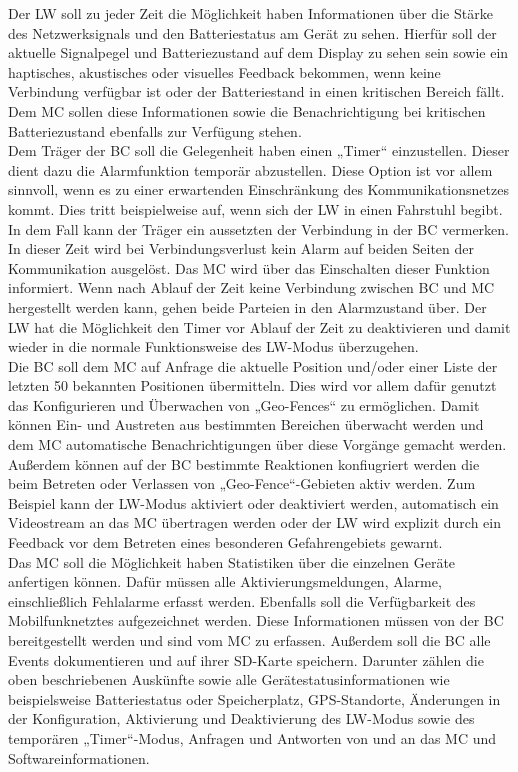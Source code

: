 \documentclass[thesis.tex]{subfiles}
\begin{document}
Der LW soll zu jeder Zeit die Möglichkeit haben Informationen über die Stärke des Netzwerksignals und den Batteriestatus am Gerät zu sehen.
Hierfür soll der aktuelle Signalpegel und Batteriezustand auf dem Display zu sehen sein sowie ein haptisches, akustisches oder visuelles
Feedback bekommen, wenn keine Verbindung verfügbar ist oder der Batteriestand in einen kritischen Bereich fällt.
Dem MC sollen diese Informationen sowie die Benachrichtigung bei kritischen Batteriezustand ebenfalls zur Verfügung stehen.
\\

Dem Träger der BC soll die Gelegenheit haben einen „Timer“ einzustellen.
Dieser dient dazu die Alarmfunktion temporär abzustellen.
Diese Option ist vor allem sinnvoll, wenn es zu einer erwartenden Einschränkung des Kommunikationsnetzes kommt.
Dies tritt beispielweise auf, wenn sich der LW in einen Fahrstuhl begibt.
In dem Fall kann der Träger ein aussetzten der Verbindung in der BC vermerken.
In dieser Zeit wird bei Verbindungsverlust kein Alarm auf beiden Seiten der Kommunikation ausgelöst.
Das MC wird über das Einschalten dieser Funktion informiert.
Wenn nach Ablauf der Zeit keine Verbindung zwischen BC und MC hergestellt werden kann, gehen beide Parteien in den Alarmzustand über.
Der LW hat die Möglichkeit den Timer vor Ablauf der Zeit zu deaktivieren und damit wieder in die normale Funktionsweise des LW-Modus überzugehen.
\\

Die BC soll dem MC auf Anfrage die aktuelle Position und/oder einer Liste der letzten 50 bekannten Positionen übermitteln.
Dies wird vor allem dafür genutzt das Konfigurieren und Überwachen von „Geo-Fences“ zu ermöglichen.
Damit können Ein- und Austreten aus bestimmten Bereichen überwacht werden und dem MC automatische Benachrichtigungen
über diese Vorgänge gemacht werden.
Außerdem können auf der BC bestimmte Reaktionen konfiugriert werden die beim Betreten oder Verlassen von „Geo-Fence“-Gebieten aktiv werden.
Zum Beispiel kann der LW-Modus aktiviert oder deaktiviert werden, automatisch ein Videostream an das MC übertragen werden
oder der LW wird explizit durch ein Feedback vor dem Betreten eines besonderen Gefahrengebiets gewarnt.
\\

Das MC soll die Möglichkeit haben Statistiken über die einzelnen Geräte anfertigen können.
Dafür müssen alle Aktivierungsmeldungen, Alarme, einschließlich Fehlalarme erfasst werden.
Ebenfalls soll die Verfügbarkeit des Mobilfunknetztes aufgezeichnet werden.
Diese Informationen müssen von der BC bereitgestellt werden und sind vom MC zu erfassen.
Außerdem soll die BC alle Events dokumentieren und auf ihrer SD-Karte speichern.
Darunter zählen die oben beschriebenen Auskünfte sowie alle Gerätestatusinformationen wie beispielsweise Batteriestatus
oder Speicherplatz, GPS-Standorte, Änderungen in der Konfiguration, Aktivierung und Deaktivierung des LW-Modus
sowie des temporären „Timer“-Modus, Anfragen und Antworten von und an das MC und Softwareinformationen.
\\
\end{document}
